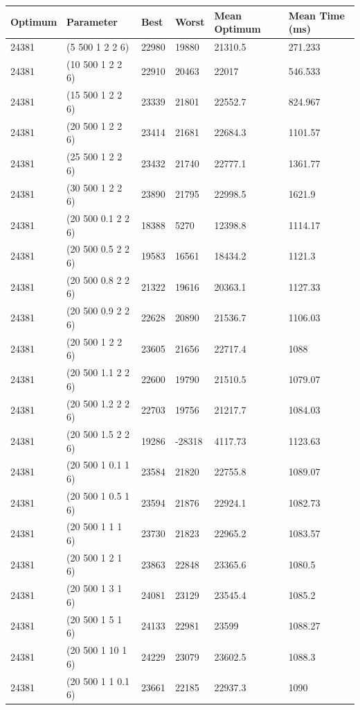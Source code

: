\documentclass{article}
\begin{document}
\begin{tabular}{|l|l|l|l|l|l|}
	\hline
	Optimum & Parameter & Best & Worst & Mean Optimum & Mean Time (ms) \\ \hline
	24381 & (5 500 1 2 2 6) & 22980 & 19880 & 21310.5 & 271.233 \\ \hline
	24381 & (10 500 1 2 2 6) & 22910 & 20463 & 22017 & 546.533 \\ \hline
	24381 & (15 500 1 2 2 6) & 23339 & 21801 & 22552.7 & 824.967 \\ \hline
	24381 & (20 500 1 2 2 6) & 23414 & 21681 & 22684.3 & 1101.57 \\ \hline
	24381 & (25 500 1 2 2 6) & 23432 & 21740 & 22777.1 & 1361.77 \\ \hline
	24381 & (30 500 1 2 2 6) & 23890 & 21795 & 22998.5 & 1621.9 \\ \hline
	24381 & (20 500 0.1 2 2 6) & 18388 & 5270 & 12398.8 & 1114.17 \\ \hline
	24381 & (20 500 0.5 2 2 6) & 19583 & 16561 & 18434.2 & 1121.3 \\ \hline
	24381 & (20 500 0.8 2 2 6) & 21322 & 19616 & 20363.1 & 1127.33 \\ \hline
	24381 & (20 500 0.9 2 2 6) & 22628 & 20890 & 21536.7 & 1106.03 \\ \hline
	24381 & (20 500 1 2 2 6) & 23605 & 21656 & 22717.4 & 1088 \\ \hline
	24381 & (20 500 1.1 2 2 6) & 22600 & 19790 & 21510.5 & 1079.07 \\ \hline
	24381 & (20 500 1.2 2 2 6) & 22703 & 19756 & 21217.7 & 1084.03 \\ \hline
	24381 & (20 500 1.5 2 2 6) & 19286 & -28318 & 4117.73 & 1123.63 \\ \hline
	24381 & (20 500 1 0.1 1 6) & 23584 & 21820 & 22755.8 & 1089.07 \\ \hline
	24381 & (20 500 1 0.5 1 6) & 23594 & 21876 & 22924.1 & 1082.73 \\ \hline
	24381 & (20 500 1 1 1 6) & 23730 & 21823 & 22965.2 & 1083.57 \\ \hline
	24381 & (20 500 1 2 1 6) & 23863 & 22848 & 23365.6 & 1080.5 \\ \hline
	24381 & (20 500 1 3 1 6) & 24081 & 23129 & 23545.4 & 1085.2 \\ \hline
	24381 & (20 500 1 5 1 6) & 24133 & 22981 & 23599 & 1088.27 \\ \hline
	24381 & (20 500 1 10 1 6) & 24229 & 23079 & 23602.5 & 1088.3 \\ \hline
	24381 & (20 500 1 1 0.1 6) & 23661 & 22185 & 22937.3 & 1090 \\ \hline

\end{tabular}
\end{document}
